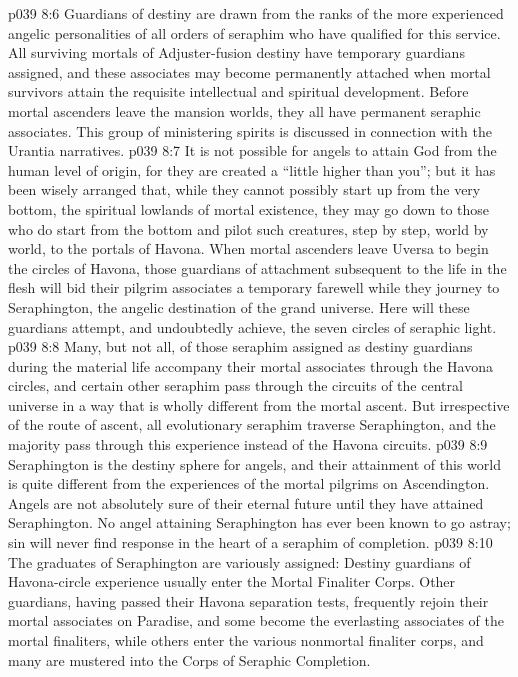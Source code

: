 \vs p039 8:6 Guardians of destiny are drawn from the ranks of the more experienced angelic personalities of all orders of seraphim who have qualified for this service. All surviving mortals of Adjuster\hyp{}fusion destiny have temporary guardians assigned, and these associates may become permanently attached when mortal survivors attain the requisite intellectual and spiritual development. Before mortal ascenders leave the mansion worlds, they all have permanent seraphic associates. This group of ministering spirits is discussed in connection with the Urantia narratives.
\pc \vs p039 8:7 It is not possible for angels to attain God from the human level of origin, for they are created a “little higher than you”; but it has been wisely arranged that, while they cannot possibly start up from the very bottom, the spiritual lowlands of mortal existence, they may go down to those who do start from the bottom and pilot such creatures, step by step, world by world, to the portals of Havona. When mortal ascenders leave Uversa to begin the circles of Havona, those guardians of attachment subsequent to the life in the flesh will bid their pilgrim associates a temporary farewell while they journey to Seraphington, the angelic destination of the grand universe. Here will these guardians attempt, and undoubtedly achieve, the seven circles of seraphic light.
\vs p039 8:8 Many, but not all, of those seraphim assigned as destiny guardians during the material life accompany their mortal associates through the Havona circles, and certain other seraphim pass through the circuits of the central universe in a way that is wholly different from the mortal ascent. But irrespective of the route of ascent, all evolutionary seraphim traverse Seraphington, and the majority pass through this experience instead of the Havona circuits.
\pc \vs p039 8:9 Seraphington is the destiny sphere for angels, and their attainment of this world is quite different from the experiences of the mortal pilgrims on Ascendington. Angels are not absolutely sure of their eternal future until they have attained Seraphington. No angel attaining Seraphington has ever been known to go astray; sin will never find response in the heart of a seraphim of completion.\plusone
\vs p039 8:10 The graduates of Seraphington are variously assigned: Destiny guardians of Havona\hyp{}circle experience usually enter the Mortal Finaliter Corps. Other guardians, having passed their Havona separation tests, frequently rejoin their mortal associates on Paradise, and some become the everlasting associates of the mortal finaliters, while others enter the various nonmortal finaliter corps, and many are mustered into the Corps of Seraphic Completion.
